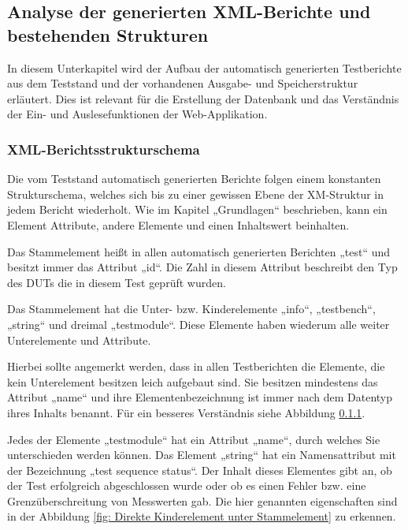\subsection{Analyse der generierten XML-Berichte und bestehenden Strukturen}
\label{subsec:analyse-der-generierten-xml-berichte-und-bestehenden-strukturen}

In diesem Unterkapitel wird der Aufbau der automatisch
generierten Testberichte aus dem Teststand und der vorhandenen Ausgabe- und Speicherstruktur
erläutert. Dies ist relevant für die Erstellung der Datenbank und das
Verständnis der Ein- und Auslesefunktionen der Web-Applikation.

\subsubsection{XML-Berichtsstrukturschema}

Die vom Teststand automatisch generierten
Berichte folgen einem konstanten Strukturschema, welches sich bis zu einer
gewissen Ebene der XM-Struktur in jedem Bericht wiederholt. Wie im Kapitel „Grundlagen“
beschrieben, kann ein Element Attribute, andere Elemente und einen Inhaltswert beinhalten.

Das Stammelement heißt in allen automatisch
generierten Berichten „test“ und besitzt immer das Attribut „id“. Die Zahl in
diesem Attribut beschreibt den Typ des \ac{DUTs} die in diesem Test geprüft wurden.

Das Stammelement hat die Unter- bzw.
Kinderelemente „info“, „testbench“, „string“ und dreimal „testmodule“. Diese
Elemente haben wiederum alle weiter Unterelemente und Attribute.

Hierbei sollte angemerkt werden, dass in allen Testberichten die Elemente, die kein Unterelement besitzen leich aufgebaut sind.
Sie besitzen mindestens das Attribut „name“ und ihre Elementenbezeichnung ist immer nach dem Datentyp ihres Inhalts benannt.
Für ein besseres Verständnis siehe Abbildung \ref{}.



Jedes der Elemente „testmodule“ hat ein Attribut
„name“, durch welches Sie unterschieden werden können. Das Element „string“ hat
ein Namensattribut mit der Bezeichnung „test sequence status“. Der Inhalt
dieses Elementes gibt an, ob der Test erfolgreich abgeschlossen wurde oder ob
es einen Fehler bzw. eine Grenzüberschreitung von Messwerten gab.
Die hier genannten eigenschaften sind in der Abbildung \ref{fig: Direkte Kinderelement unter Stammelement} zu erkennen.

